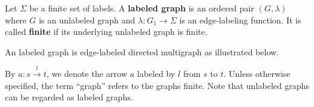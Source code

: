\documentclass{book}
\begin{document}
    \begin{definition}
        \label{def:graph}
        Let \(\Sigma\) be a finite set of labels. A \textbf{labeled graph} is an ordered pair \((G,\lambda)\) where \( G \) is an unlabeled graph and \( \lambda : G_1 \rightarrow \Sigma\) is an edge-labeling function. 
        It is called \textbf{finite} if its underlying unlabeled graph is finite.  
    \end{definition}
    \begin{example} An labeled graph is edge-labeled directed multigraph as illustrated below.
       
        \begin{center}
      \end{center} 
    \end{example}
    By $a : s\overset{l}{\rightarrow} t$, we denote the arrow $a$ labeled by $l$ from $s$ to $t$. Unless otherwise specified, the term \enquote{graph} refers to the graphs finite. Note that unlabeled graphs can be regarded as labeled graphs. 
\end{document}
